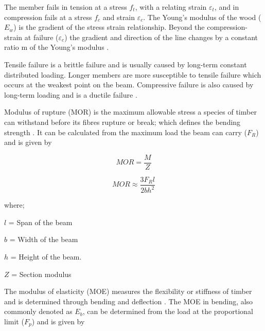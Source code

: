 \documentclass[11pt,a4paper]{article}
\numberwithin{equation}{subsection}
\begin{document}
	 \noindent
	 The member fails in tension at a stress $f_{t}$, with a relating strain $\varepsilon_{t}$, and in compression fails at a stress $f_{c}$ and strain $\varepsilon_{c}$. The Young's modulus of the wood ($E_{w}$) is the gradient of the stress strain relationship. Beyond the compression-strain at failure ($\varepsilon_{c}$) the gradient and direction of the line changes by a constant ratio m of the Young's modulus \cite{plevris_frp-reinforced_1992,fiorelli_fiberglass-reinforced_2006}.
	 
     \vspace*{\baselineskip}	
	 
	 \noindent
	 Tensile failure is a brittle failure and is usually caused by long-term constant distributed loading. Longer members are more susceptible to tensile failure which occurs at the weakest point on the beam. Compressive failure is also caused by long-term loading and is a ductile failure \cite{thelandersson_timber_2003}. 
	 
     \vspace*{\baselineskip}
	 
   	\noindent
   	Modulus of rupture (MOR) is the maximum allowable stress a species of timber can withstand before its fibres rupture or break; which defines the bending strength \cite{markwardt_strength_1935}. It can be calculated from the maximum load the beam can carry ($F_{R}$) \cite{walker_primary_2013}  and is given by
   	
   	\begin{equation}
   	MOR = \dfrac{M}{Z} 
   	\end{equation}
   	
   	\begin{equation}
   	MOR \approx \dfrac{3 F_{R} l}{2bh^{2}} 
   	\end{equation}
   	
   	\noindent
   	where; \par
   	$ l $ = Span of the beam \par
   	$ b $ = Width of the beam \par
   	$ h $ = Height of the beam. \par
   	$ Z $ = Section modulus \par
   	 
   	\vspace*{\baselineskip}
   	
   	\noindent
   	 The modulus of elasticity (MOE) measures the flexibility or stiffness of timber and is determined through bending and deflection \cite{walker_primary_2013,agriculture_encyclopedia_2007}. The MOE in bending, also commonly denoted as $E_{b}$, can be determined from the load at the proportional limit ($F_{p}$) \cite{agriculture_encyclopedia_2007} and is given by
   	 
\end{document}
